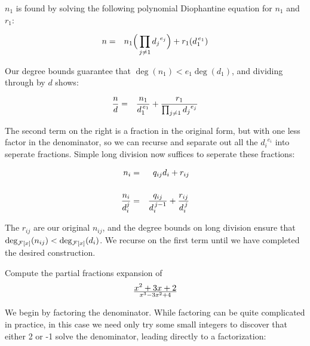 $n_1$ is found by solving the following polynomial Diophantine
equation for $n_1$ and $r_1$:

\begin{eqnarray*}
n &=& n_1 \Big( \prod_{j\ne 1} {d_j}^{e_j} \Big) + r_1 (d_1^{\,e_1}) \cr
\end{eqnarray*}

Our degree bounds guarantee that
$\deg(n_1) < e_1\deg(d_1)$, and dividing through by $d$ shows:

\begin{eqnarray*}
{n\over d} &=& {{n_1}\over{d_1^{\,e_1}}} + {r_1\over{\prod_{j\ne 1} {d_j}^{e_j}}} \cr
\end{eqnarray*}

The second term on the right is a fraction in the original form,
but with one less factor in the denominator, so we can recurse
and separate out all the ${d_i}^{e_i}$ into seperate fractions.
Simple long division now suffices to seperate these fractions:

\begin{eqnarray*}
n_i &=& q_{ij} d_i + r_{ij} \cr\cr
{{n_i}\over{d_i^j}} &=& {{q_{ij}}\over{d_i^{\,j-1}}} + {r_{ij}\over{d_i^{\,j}}} \cr
\end{eqnarray*}

The $r_{ij}$ are our original $n_{ij}$, and the degree bounds on long
division ensure that $\deg_{{\cal F}[x]}(n_{ij}) < \deg_{{\cal F}[x]}(d_i)$.
We recurse on the first term until we have completed the desired construction.

\vfill\eject

\example

Compute the partial fractions expansion of $${x^2 + 3x + 2}\over{x^3-3x^2+4}$$

We begin by factoring the denominator.  While factoring can be quite
complicated in practice, in this case we need only try some small
integers to discover that either 2 or -1 solve the denominator,
leading directly to a factorization:

\begin{comment}
Differentiating to obtain $3x^2-6x$.
Computing the GCD of $x^3-3x^2+4$ and $3x^2-6x$:



Thus, $-2x+4$ is a GCD, which we normalize by dividing through by -2
to obtain $x-2$.  We could now proceed by dividing $x^3-3x^2+4$ by
$x-2$ to obtain $x^2-x-2$ (all factors at unit power), compute the GCD
of $x-2$ and $x^2-x-2$ to obtain $x-2$ (all higher factors at unit
power), divide $x^2-x-2$ by $x-2$ to obtain $x+1$ (the unit
square-free factor), and repeat the process (trivially) with $x-2$ to
decide that $x-2$ is the second square-free factor.  Or, we could
shortcut the entire process by noting that since $x-2$ is linear,
it can only be the second square-free factor.  In any event, we conclude that:

\end{comment}

